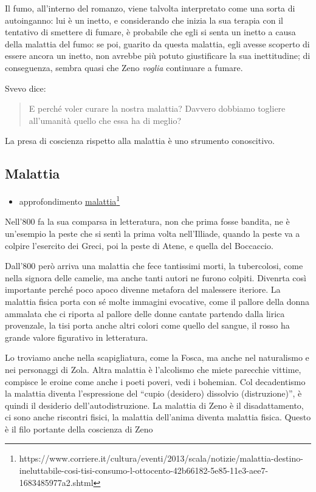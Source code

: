 \documentclass[a4paper, twoside, titlepage]{book}
\newcommand{\elenco}[1]{%
\begin{itemize}
#1
\end{itemize}}
\newcommand{\citazione}[1]{%
  \begin{quotation}
  \noindent #1
  \end{quotation}}
\renewcommand{\emph}[1]{\textcolor{blue}{#1}}
\begin{document}
Il fumo, all'interno del romanzo, viene talvolta interpretato come una sorta di autoinganno: lui è un inetto, e considerando che inizia la sua terapia con il tentativo di smettere di fumare, è probabile che egli si senta un inetto a causa della malattia del fumo: se poi, guarito da questa malattia, egli avesse scoperto di essere ancora un inetto, non avrebbe più potuto giustificare la sua inettitudine; di conseguenza, sembra quasi che Zeno \textit{voglia} continuare a fumare.

Svevo dice:
\citazione{E perché voler curare la nostra malattia? Davvero dobbiamo togliere all'umanità quello che essa ha di meglio?}

La presa di coscienza rispetto alla malattia è uno strumento conoscitivo.

\subsection{Malattia}

\elenco{\item approfondimento \emph{\href{https://www.corriere.it/cultura/eventi/2013/scala/notizie/malattia-destino-ineluttabile-cosi-tisi-consumo-l-ottocento-42b66182-5e85-11e3-aee7-1683485977a2.shtml}{malattia}\footnote{https://www.corriere.it/cultura/eventi/2013/scala/notizie/malattia-destino-ineluttabile-cosi-tisi-consumo-l-ottocento-42b66182-5e85-11e3-aee7-1683485977a2.shtml}}
}
Nell’800 fa la sua comparsa in letteratura, non che prima fosse bandita, ne è un’esempio la peste che si sentì la prima volta nell’Illiade, quando la peste va a colpire l’esercito dei Greci, poi la peste di Atene, e quella del Boccaccio.

Dall’800 però arriva una malattia che fece tantissimi morti, la tubercolosi, come nella signora delle camelie, ma anche tanti autori ne furono colpiti. 
Divenrta così importante perché poco  apoco divenne metafora del malessere iteriore. La malattia fisica porta con sé molte immagini evocative, come il pallore della donna ammalata che ci riporta al pallore delle donne cantate partendo dalla lirica provenzale, la tisi porta anche altri colori come quello del sangue, il rosso ha grande valore figurativo in letteratura.

Lo troviamo anche nella scapigliatura, come la Fosca, ma anche nel naturalismo e nei personaggi di Zola. Altra malattia è l’alcolismo che miete parecchie vittime, compisce le eroine come anche i poeti poveri, vedi i bohemian. 
Col decadentismo la malattia diventa l’espressione del “cupio (desidero) dissolvio (distruzione)”, è quindi il desiderio dell’autodistruzione. 
La malattia di Zeno è il disadattamento, ci sono anche riscontri fisici, la malattia dell’anima diventa malattia fisica. Questo è il filo portante della coscienza di Zeno
\end{document}
